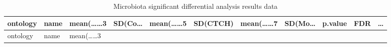 \documentclass[
]{article}
\begin{document}
\begin{longtable}[]{@{}lllllllllll@{}}
\caption{\label{tab:microbiota-significant-differential-analysis-results-data}Microbiota significant differential analysis results data}\tabularnewline
\toprule
\begin{minipage}[b]{0.06\columnwidth}\raggedright
ontology\strut
\end{minipage} & \begin{minipage}[b]{0.06\columnwidth}\raggedright
name\strut
\end{minipage} & \begin{minipage}[b]{0.09\columnwidth}\raggedright
mean(\ldots\ldots3\strut
\end{minipage} & \begin{minipage}[b]{0.06\columnwidth}\raggedright
SD(Co\ldots{}\strut
\end{minipage} & \begin{minipage}[b]{0.09\columnwidth}\raggedright
mean(\ldots\ldots5\strut
\end{minipage} & \begin{minipage}[b]{0.06\columnwidth}\raggedright
SD(CTCH)\strut
\end{minipage} & \begin{minipage}[b]{0.09\columnwidth}\raggedright
mean(\ldots\ldots7\strut
\end{minipage} & \begin{minipage}[b]{0.06\columnwidth}\raggedright
SD(Mo\ldots{}\strut
\end{minipage} & \begin{minipage}[b]{0.06\columnwidth}\raggedright
p.value\strut
\end{minipage} & \begin{minipage}[b]{0.06\columnwidth}\raggedright
FDR\strut
\end{minipage} & \begin{minipage}[b]{0.03\columnwidth}\raggedright
\ldots{}\strut
\end{minipage}\tabularnewline
\midrule
\endfirsthead
\toprule
\begin{minipage}[b]{0.06\columnwidth}\raggedright
ontology\strut
\end{minipage} & \begin{minipage}[b]{0.06\columnwidth}\raggedright
name\strut
\end{minipage} & \begin{minipage}[b]{0.09\columnwidth}\raggedright
mean(\ldots\ldots3\strut
\end{minipage} & \begin{minipage}[b]{0.06\columnwidth}\raggedright

\end{minipage}
\end{longtable}
\end{document}
